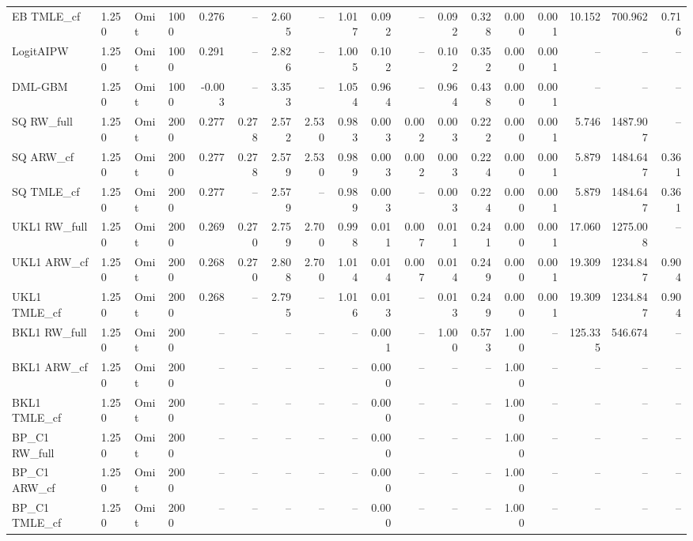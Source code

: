 \begin{tabular}{llllrrrrrrrrrrrrrr}
EB TMLE\_cf & 1.250 & Omit & 1000 & 0.276 & -- & 2.605 & -- & 1.017 & 0.092 & -- & 0.092 & 0.328 & 0.000 & 0.001 & 10.152 & 700.962 & 0.716 \\
LogitAIPW & 1.250 & Omit & 1000 & 0.291 & -- & 2.826 & -- & 1.005 & 0.102 & -- & 0.102 & 0.352 & 0.000 & 0.001 & -- & -- & -- \\
DML-GBM & 1.250 & Omit & 1000 & -0.003 & -- & 3.353 & -- & 1.054 & 0.964 & -- & 0.964 & 0.438 & 0.000 & 0.001 & -- & -- & -- \\
SQ RW\_full & 1.250 & Omit & 2000 & 0.277 & 0.278 & 2.572 & 2.530 & 0.983 & 0.003 & 0.002 & 0.003 & 0.222 & 0.000 & 0.001 & 5.746 & 1487.907 & -- \\
SQ ARW\_cf & 1.250 & Omit & 2000 & 0.277 & 0.278 & 2.579 & 2.530 & 0.989 & 0.003 & 0.002 & 0.003 & 0.224 & 0.000 & 0.001 & 5.879 & 1484.647 & 0.361 \\
SQ TMLE\_cf & 1.250 & Omit & 2000 & 0.277 & -- & 2.579 & -- & 0.989 & 0.003 & -- & 0.003 & 0.224 & 0.000 & 0.001 & 5.879 & 1484.647 & 0.361 \\
UKL1 RW\_full & 1.250 & Omit & 2000 & 0.269 & 0.270 & 2.759 & 2.700 & 0.998 & 0.011 & 0.007 & 0.011 & 0.241 & 0.000 & 0.001 & 17.060 & 1275.008 & -- \\
UKL1 ARW\_cf & 1.250 & Omit & 2000 & 0.268 & 0.270 & 2.808 & 2.700 & 1.014 & 0.014 & 0.007 & 0.014 & 0.249 & 0.000 & 0.001 & 19.309 & 1234.847 & 0.904 \\
UKL1 TMLE\_cf & 1.250 & Omit & 2000 & 0.268 & -- & 2.795 & -- & 1.016 & 0.013 & -- & 0.013 & 0.249 & 0.000 & 0.001 & 19.309 & 1234.847 & 0.904 \\
BKL1 RW\_full & 1.250 & Omit & 2000 & -- & -- & -- & -- & -- & 0.001 & -- & 1.000 & 0.573 & 1.000 & -- & 125.335 & 546.674 & -- \\
BKL1 ARW\_cf & 1.250 & Omit & 2000 & -- & -- & -- & -- & -- & 0.000 & -- & -- & -- & 1.000 & -- & -- & -- & -- \\
BKL1 TMLE\_cf & 1.250 & Omit & 2000 & -- & -- & -- & -- & -- & 0.000 & -- & -- & -- & 1.000 & -- & -- & -- & -- \\
BP\_C1 RW\_full & 1.250 & Omit & 2000 & -- & -- & -- & -- & -- & 0.000 & -- & -- & -- & 1.000 & -- & -- & -- & -- \\
BP\_C1 ARW\_cf & 1.250 & Omit & 2000 & -- & -- & -- & -- & -- & 0.000 & -- & -- & -- & 1.000 & -- & -- & -- & -- \\
BP\_C1 TMLE\_cf & 1.250 & Omit & 2000 & -- & -- & -- & -- & -- & 0.000 & -- & -- & -- & 1.000 & -- & -- & -- & -- \\

\end{tabular}
